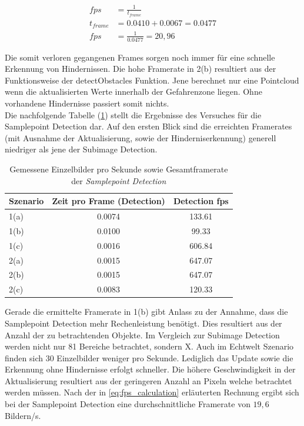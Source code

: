 \begin{equation}
\label{eq:fps_calculation}
\begin{aligned}
	fps &= \frac{1}{t_{frame}}\\
	t_{frame} &= 0.0410 + 0.0067 = 0.0477\\
	fps &= \frac{1}{0.0477} = 20,96
\end{aligned}
\end{equation}

\noindent
Die somit verloren gegangenen Frames sorgen noch immer für eine schnelle Erkennung von Hindernissen. Die hohe Framerate in 2(b) resultiert aus der Funktionsweise der detectObstacles Funktion. Jene berechnet nur eine Pointcloud wenn die aktualisierten Werte innerhalb der Gefahrenzone liegen. Ohne vorhandene Hindernisse passiert somit nichts.\\

\noindent
Die nachfolgende Tabelle (\ref{tbl:samplepoint_framerate}) stellt die Ergebnisse des Versuches für die Samplepoint Detection dar. Auf den ersten Blick sind die erreichten Framerates (mit Ausnahme der Aktualisierung, sowie der Hinderniserkennung) generell niedriger als jene der Subimage Detection. 

\begin{table}[h]
\centering
\begin{tabular}{|l|c|c|}
\hline
Szenario & Zeit pro Frame (Detection) & Detection fps \\ \hline \hline
1(a)     & 0.0074           			  & 133.61        \\ \hline
1(b)     & 0.0100           			  & 99.33         \\ \hline
1(c)     & 0.0016           			  & 606.84        \\ \hline \hline
2(a)     & 0.0015           			  & 647.07        \\ \hline
2(b)     & 0.0015           		  	  & 647.07        \\ \hline
2(c)     & 0.0083           	 		  & 120.33        \\ \hline
\end{tabular}
\caption{Gemessene Einzelbilder pro Sekunde sowie Gesamtframerate der \emph{Samplepoint Detection}}
\label{tbl:samplepoint_framerate}
\end{table}

\noindent
Gerade die ermittelte Framerate in 1(b) gibt Anlass zu der Annahme, dass die Samplepoint Detection mehr Rechenleistung benötigt. Dies resultiert aus der Anzahl der zu betrachtenden Objekte. Im Vergleich zur Subimage Detection werden nicht nur 81 Bereiche betrachtet, sondern X. Auch im Echtwelt Szenario finden sich 30 Einzelbilder weniger pro Sekunde. Lediglich das Update sowie die Erkennung ohne Hindernisse erfolgt schneller. Die höhere Geschwindigkeit in der Aktualisierung resultiert aus der geringeren Anzahl an Pixeln welche betrachtet werden müssen. Nach der in \ref{eq:fps_calculation} erläuterten Rechnung ergibt sich bei der Samplepoint Detection eine durchschnittliche Framerate von $19,6$ Bildern/s.\\

